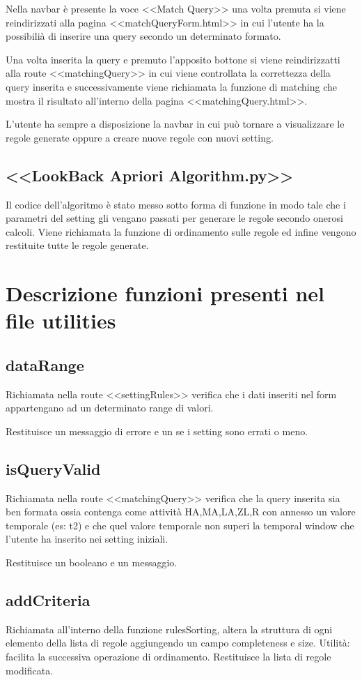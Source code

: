 \documentclass{article}
\begin{document}
Nella navbar è presente la voce <<Match Query>> una volta premuta si viene reindirizzati alla pagina <<matchQueryForm.html>> in cui l'utente ha la possibilià di inserire una query secondo un determinato formato.

Una volta inserita la query e premuto l'apposito bottone si viene reindirizzatti alla route <<matchingQuery>> in cui viene controllata la correttezza della query inserita e successivamente viene richiamata la funzione di matching che mostra il risultato all'interno della pagina <<matchingQuery.html>>.

L'utente ha sempre a disposizione la navbar in cui può tornare a visualizzare le regole generate oppure a creare nuove regole con nuovi setting.

\subsection{<<LookBack Apriori Algorithm.py>>}
Il codice dell'algoritmo è stato messo sotto forma di funzione in modo tale che i parametri del setting gli vengano passati per generare le regole secondo onerosi calcoli.
Viene richiamata la funzione di ordinamento sulle regole ed infine vengono restituite tutte le regole generate.


\section{Descrizione funzioni presenti nel file utilities}
\subsection{dataRange}
Richiamata nella route <<settingRules>> verifica che i dati inseriti nel form appartengano ad un determinato range di valori.

Restituisce un messaggio di errore e un se i setting sono errati o meno.

\subsection{isQueryValid}
Richiamata nella route <<matchingQuery>> verifica che la query inserita sia ben formata ossia contenga come attività HA,MA,LA,ZL,R con annesso un valore temporale (es: t2) e che quel valore temporale non superi la temporal window che l'utente ha inserito nei setting iniziali.

Restituisce un booleano e un messaggio.

\subsection{addCriteria}
Richiamata all'interno della funzione rulesSorting, altera la struttura di ogni elemento della lista di regole aggiungendo un campo completeness e size.
Utilità: facilita la successiva operazione di ordinamento.
Restituisce la lista di regole modificata.
\end{document}
